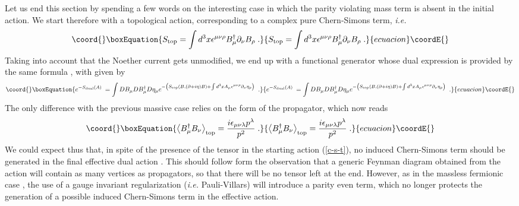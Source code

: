 \documentclass[a4paper,12pt]{article}
\begin{document}
\noindent Let us end this section by spending a few words on the interesting
case in which the parity violating mass term is absent in the initial
action. We start therefore with a topological action, corresponding to
a complex pure Chern-Simons term, {\it i.e.}
\begin{equation}\coord{}\boxEquation{
S_{{\rm top}}=\int d^3x\epsilon ^{\mu \nu \rho }B_\mu ^{\dagger
}\partial _\nu B_\rho \;.
\label{c-s-t}
}{
S_{{\rm top}}=\int d^3x\epsilon ^{\mu \nu \rho }B_\mu ^{\dagger
}\partial _\nu B_\rho \;.
}{ecuacion}\coordE{}\end{equation}
Taking into account that the \coordHE{} Noether current \myHighlight{$\left( {\rm {\ref
      {B-curr}}}\right) $}\coordHE{} gets unmodified, we end up with a functional
generator whose dual expression is provided by the same formula
\myHighlight{$\left( {\rm {\ref {B-dual}}}\right) $}\coordHE{}, with \coordHE{} given
by
\begin{equation}\coord{}\boxEquation{
e^{-S_{{\rm dual}}(A)\;}=\int DB_\mu DB_\mu ^{\dagger }D\eta _\mu e^{-\left(
S_{{\rm top}}(B,(\partial +i\eta )B)+\int d^3xA_\mu \epsilon ^{\mu \nu
\rho }\partial _\nu \eta _\rho \right) \;}\;.  \label{d-c-s}
}{
e^{-S_{{\rm dual}}(A)\;}=\int DB_\mu DB_\mu ^{\dagger }D\eta _\mu e^{-\left(
S_{{\rm top}}(B,(\partial +i\eta )B)+\int d^3xA_\mu \epsilon ^{\mu \nu
\rho }\partial _\nu \eta _\rho \right) \;}\;.  }{ecuacion}\coordE{}\end{equation}
The only difference with the previous massive case relies on the form
of the propagator, which now reads
\begin{equation}\coord{}\boxEquation{
\left\langle B_\mu ^{\dagger }B_\nu \right\rangle _{{\rm top}}=\frac{
i\epsilon _{\mu \nu \lambda }p^\lambda }{p^2}\;.  \label{c-s-prop}
}{
\left\langle B_\mu ^{\dagger }B_\nu \right\rangle _{{\rm top}}=\frac{
i\epsilon _{\mu \nu \lambda }p^\lambda }{p^2}\;.  }{ecuacion}\coordE{}\end{equation}
We could expect thus that, in spite of the presence of the \myHighlight{$\epsilon_{\mu \nu
  \rho }$}\coordHE{} tensor in the starting action (\ref{c-s-t}), no induced
Chern-Simons term should be generated in the final effective dual action
\coordHE{}. This should follow form the observation that  a
generic Feynman diagram obtained from the action \coordHE{} will contain as many vertices as propagators, so
that there will be no \myHighlight{$\epsilon$}\coordHE{} tensor left at the end. However, as in the massless fermionic case {\cite{large}}, the use of a gauge invariant regularization ({\it i.e.} Pauli-Villars) will introduce a parity even term, which no longer protects the generation of a possible induced Chern-Simons term in the effective action. 
\end{document}
